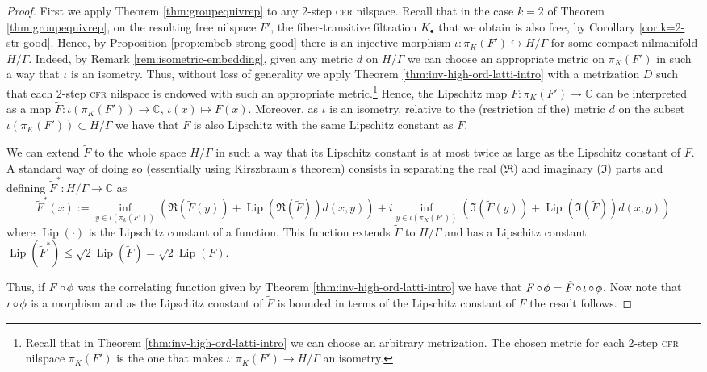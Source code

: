 \documentclass[a4paper,12pt,reqno]{amsart}
\theoremstyle{definition}
\def\to{\rightarrow}
\newcommand{\mb}{\mathbb}
\DeclareMathOperator{\Lip}{Lip}
\DeclareMathOperator{\co}{\circ\hspace{-0.02 cm}}
\begin{document}
\begin{proof}
First we apply Theorem \ref{thm:groupequivrep} to any 2-step \textsc{cfr} nilspace. Recall that in the case $k=2$ of Theorem \ref{thm:groupequivrep}, on the resulting free nilspace $F'$, the fiber-transitive filtration $K_\bullet$ that we obtain is also free, by Corollary \ref{cor:k=2-str-good}. Hence, by Proposition \ref{prop:embeb-strong-good} there is an injective morphism $\iota:\pi_K(F')\hookrightarrow H/\Gamma$ for some compact nilmanifold $H/\Gamma$. Indeed, by Remark \ref{rem:isometric-embedding}, given any metric $d$ on $H/\Gamma$ we can choose an appropriate metric on $\pi_K(F')$ in such a way that $\iota$ is an isometry. Thus, without loss of generality we apply Theorem \ref{thm:inv-high-ord-latti-intro} with a metrization $D$ such that each $2$-step \textsc{cfr} nilspace is endowed with such an appropriate metric.\footnote{Recall that in Theorem \ref{thm:inv-high-ord-latti-intro} we can choose an arbitrary metrization. The chosen metric for each 2-step \textsc{cfr} nilspace $\pi_K(F')$ is the one that makes $\iota:\pi_K(F')\to H/\Gamma$ an isometry.} Hence, the Lipschitz map $F:\pi_K(F')\to \mb{C}$ can be interpreted as a map $\tilde{F}:\iota(\pi_K(F'))\to \mb{C}$, $\iota(x)\mapsto F(x)$. Moreover, as $\iota$ is an isometry, relative to the (restriction of the) metric $d$ on the subset $\iota(\pi_K(F'))\subset H/\Gamma$ we have that $\tilde{F}$ is also Lipschitz with the same Lipschitz constant as $F$.

We can extend $\tilde{F}$ to the whole space $H/\Gamma$ in such a way that its Lipschitz constant is at most twice as large as the Lipschitz constant of $F$. A standard way of doing so (essentially using Kirszbraun's theorem) consists in separating the real ($\Re$) and imaginary ($\Im$) parts and defining $\tilde{F}^*:H/\Gamma\to \mb{C}$ as
\[
\tilde{F}^*(x):=\inf_{y\in \iota(\pi_k(F'))}(\Re(\tilde{F}(y))+\Lip(\Re(\tilde{F}))d(x,y))+i\inf_{y\in \iota(\pi_K(F'))}(\Im(\tilde{F}(y))+\Lip(\Im(\tilde{F}))d(x,y))
\]
where $\Lip(\cdot)$ is the Lipschitz constant of a function. This function extends $\tilde{F}$ to $H/\Gamma$ and has a Lipschitz constant $\Lip(\tilde{F}^*)\le \sqrt{2}\Lip(\tilde{F})=\sqrt{2}\Lip(F)$.

Thus, if $F\co \phi$ was the correlating function given by Theorem \ref{thm:inv-high-ord-latti-intro} we have that $F\co \phi = \tilde{F}\co\iota\co\phi$. Now note that $\iota\co \phi$ is a morphism and as the Lipschitz constant of $\tilde{F}$ is bounded in terms of the Lipschitz constant of $F$ the result follows. 
\end{proof}
\end{document}
